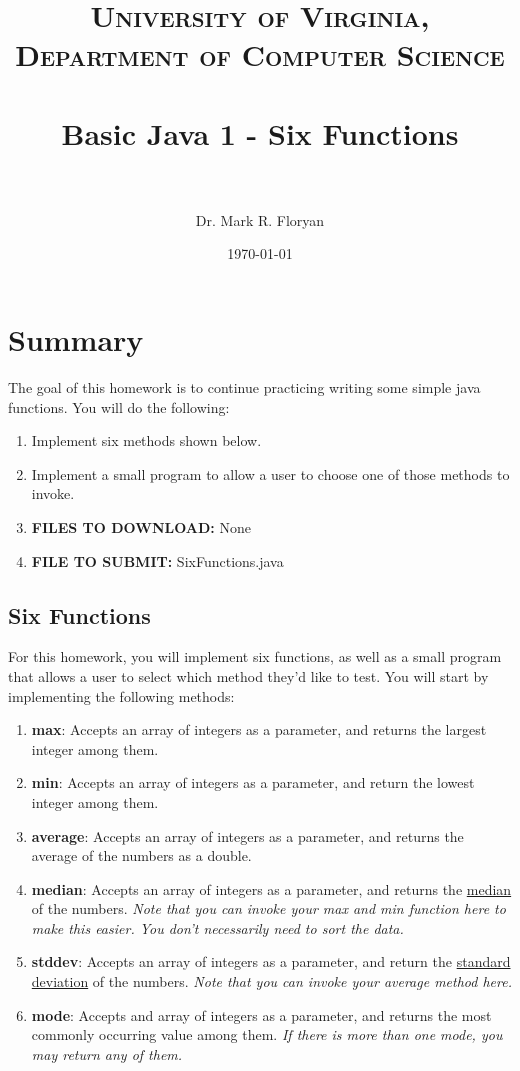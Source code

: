 \documentclass[paper=a4, fontsize=11pt, parskip=full]{scrartcl} %
\title{	
\normalfont \normalsize 
\textsc{University of Virginia, Department of Computer Science} \\ [25pt] %
\horrule{0.5pt} \\[0.4cm] %
\huge Basic Java 1 - Six Functions \\ %
\horrule{2pt} \\[0.5cm] %
}
\author{Dr. Mark R. Floryan} %
\date{\normalsize\today} %
\numberwithin{equation}{section} %
\numberwithin{figure}{section} %
\numberwithin{table}{section} %
\begin{document}
\maketitle %

\section{Summary}

The goal of this homework is to continue practicing writing some simple java functions. You will do the following:

\begin{enumerate}
	\item Implement six methods shown below.
	\item Implement a small program to allow a user to choose one of those methods to invoke.
	\item \textbf{FILES TO DOWNLOAD:} None
	\item \textbf{FILE TO SUBMIT:} SixFunctions.java
\end{enumerate}

\subsection{Six Functions}

For this homework, you will implement six functions, as well as a small program that allows a user to select which method they'd like to test. You will start by implementing the following methods:

\begin{enumerate}
\item \textbf{max}: Accepts an array of integers as a parameter, and returns the largest integer among them.
\item \textbf{min}: Accepts an array of integers as a parameter, and return the lowest integer among them.
\item \textbf{average}: Accepts an array of integers as a parameter, and returns the average of the numbers as a double.
\item \textbf{median}: Accepts an array of integers as a parameter, and returns the \href{https://en.wikipedia.org/wiki/Median}{median} of the numbers. \emph{Note that you can invoke your max and min function here to make this easier. You don't necessarily need to sort the data.} 
\item \textbf{stddev}: Accepts an array of integers as a parameter, and return the \href{https://en.wikipedia.org/wiki/Standard_deviation}{standard deviation} of the numbers. \emph{Note that you can invoke your average method here.}
\item \textbf{mode}: Accepts and array of integers as a parameter, and returns the most commonly occurring value among them. \emph{If there is more than one mode, you may return any of them.}
\end{enumerate}
\end{document}
